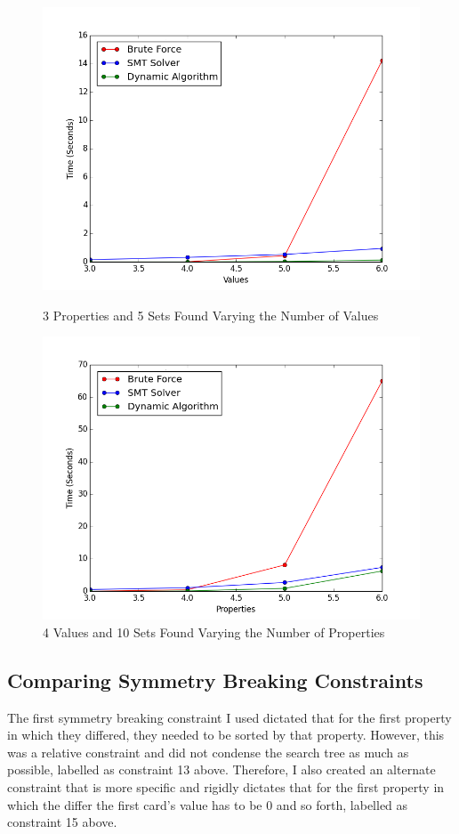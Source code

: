 \documentclass[pageno]{jpaper}
\begin{document}
\begin{figure}[htbb]
\begin{minipage}[b]{0.5\linewidth}
\centering
\includegraphics[width=.75\linewidth]{BADBRUTEVAL-v3456p3n5.png}
\caption{3 Properties and 5 Sets Found Varying the Number of Values}
\label{fig:bruteVal}
\end{minipage}
\hspace{0.5cm}
\begin{minipage}[b]{0.5\linewidth}
\centering
\includegraphics[width=.75\linewidth]{BADBRUTEPROP-v4p3456n10.png}
\caption{4 Values and 10 Sets Found Varying the Number of Properties}
\label{fig:bruteProp}
\end{minipage}
\end{figure}



\subsection{Comparing Symmetry Breaking Constraints}

The first symmetry breaking constraint I used dictated that for the first property in which they differed, they needed to be sorted by that property. However, this was a relative constraint and did not condense the search tree as much as possible, labelled as constraint 13 above. Therefore, I also created an alternate constraint that is more specific and rigidly dictates that for the first property in which the differ the first card's value has to be 0 and so forth, labelled as constraint 15 above. 
\end{document}
